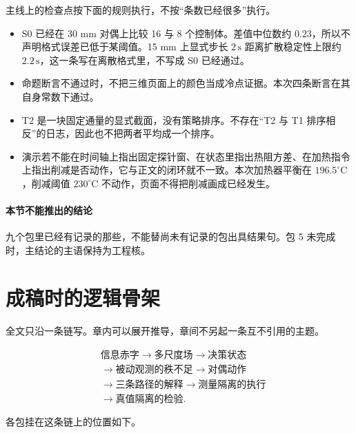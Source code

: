 主线上的检查点按下面的规则执行，不按“条数已经很多”执行。

\begin{itemize}
\item S0 已经在 30 mm 对偶上比较 16 与 8 个控制体。差值中位数约 \(0.23\)，所以不声明格式误差已低于某阈值。15 mm 上显式步长 \(2\,\mathrm{s}\) 距离扩散稳定性上限约 \(2.2\,\mathrm{s}\)，这一条写在离散格式里，不写成 S0 已经通过。
\item 命题断言不通过时，不把三维页面上的颜色当成冷点证据。本次四条断言在其自身常数下通过。
\item T2 是一块固定通量的显式截面，没有策略排序。不存在“T2 与 T1 排序相反”的日志，因此也不把两者平均成一个排序。
\item 演示若不能在时间轴上指出固定探针窗、在状态里指出热阻方差、在加热指令上指出削减是否动作，它与正文的闭环就不一致。本次加热器平衡在 \(196.5^\circ\mathrm{C}\)，削减阈值 \(230^\circ\mathrm{C}\) 不动作，页面不得把削减画成已经发生。
\end{itemize}

\paragraph{本节不能推出的结论}
九个包里已经有记录的那些，不能替尚未有记录的包出具结果句。包 5 未完成时，主结论的主语保持为工程核。

\section{成稿时的逻辑骨架}

全文只沿一条链写。章内可以展开推导，章间不另起一条互不引用的主题。

\[
\begin{aligned}
&\text{信息赤字}
\to\text{多尺度场}
\to\text{决策状态}\\
&\to\text{被动观测的秩不足}
\to\text{对偶动作}\\
&\to\text{三条路径的解释}
\to\text{测量隔离的执行}\\
&\to\text{真值隔离的检验}.
\end{aligned}
\]

各包挂在这条链上的位置如下。


